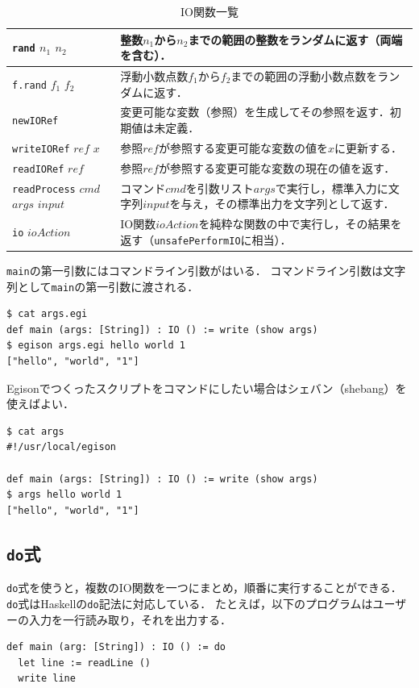 \begin{table}[h]
\begin{center}
\begin{tabular}{ | l | p{9.5cm} |}
    \texttt{rand} $n_1$ $n_2$ & 整数$n_1$から$n_2$までの範囲の整数をランダムに返す（両端を含む）． \\ \hline
    \texttt{f.rand} $f_1$ $f_2$ & 浮動小数点数$f_1$から$f_2$までの範囲の浮動小数点数をランダムに返す． \\ \hline
    \texttt{newIORef} & 変更可能な変数（参照）を生成してその参照を返す．初期値は未定義． \\ \hline
    \texttt{writeIORef} $ref$ $x$ & 参照$ref$が参照する変更可能な変数の値を$x$に更新する． \\ \hline
    \texttt{readIORef} $ref$ & 参照$ref$が参照する変更可能な変数の現在の値を返す． \\ \hline
    \texttt{readProcess} $cmd$ $args$ $input$ & コマンド$cmd$を引数リスト$args$で実行し，標準入力に文字列$input$を与え，その標準出力を文字列として返す． \\ \hline
    \texttt{io} $ioAction$ & IO関数$ioAction$を純粋な関数の中で実行し，その結果を返す（\texttt{unsafePerformIO}に相当）． \\ \hline
    \end{tabular}
\end{center}
    \caption{IO関数一覧}
    \label{tab:ioFunctions}
\end{table}

\lstinline{main}の第一引数にはコマンドライン引数がはいる．
コマンドライン引数は文字列として\lstinline{main}の第一引数に渡される．
\begin{lstlisting}[language=egison,numbers=none]
$ cat args.egi
def main (args: [String]) : IO () := write (show args)
$ egison args.egi hello world 1
["hello", "world", "1"]
\end{lstlisting}

Egisonでつくったスクリプトをコマンドにしたい場合はシェバン（shebang）を使えばよい．
\begin{lstlisting}[language=egison,numbers=none]
$ cat args
#!/usr/local/egison

def main (args: [String]) : IO () := write (show args)
$ args hello world 1
["hello", "world", "1"]
\end{lstlisting}

\subsection{\texttt{do}式}

\lstinline{do}式を使うと，複数のIO関数を一つにまとめ，順番に実行することができる．
\lstinline{do}式はHaskellの\lstinline{do}記法に対応している．
たとえば，以下のプログラムはユーザーの入力を一行読み取り，それを出力する．
\begin{lstlisting}[language=egison,numbers=none]
def main (arg: [String]) : IO () := do
  let line := readLine ()
  write line
\end{lstlisting}

